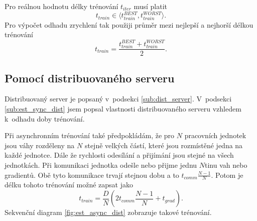 Pro reálnou hodnotu délky trénování $t_{iter}$ musí platit \begin{equation}t_{train} \in \langle t_{train}^{BEST},t_{train}^{WORST} \rangle.\label{eq:est_async_in}\end{equation}
Pro výpočet odhadu zrychlení tak použiji průměr mezi nejlepší a nejhorší délkou trénování \begin{equation}t_{train} = \frac{t_{train}^{BEST}+t_{train}^{WORST}}{2}.\label{eq:est_async_mean}\end{equation}

\subsection{Pomocí distribuovaného serveru}
\label{sub:est_async_dist}

Distribuovaný server je popsaný v~podsekci \ref{sub:dist_server}.
V~podsekci \ref{sub:est_sync_dist} jsem popsal vlastnosti distribuovaného serveru vzhledem k~odhadu doby trénování.

Při asynchronním trénování také předpokládám, že pro $N$ pracovních jednotek jsou váhy rozděleny na $N$ stejně velkých částí, které jsou rozmístěné jedna na každé jednotce.
Dále že rychlosti odesílání a přijímání jsou stejné na všech jednotkách.
Při komunikaci jednotka odešle nebo přijme jednu $N$tinu vah nebo gradientů.
Obě tyto komunikace trvají stejnou dobu a to $t_{comm}\frac{N-1}{N}$.
Potom je délku tohoto trénování možné zapsat jako \begin{equation}t_{train}=\frac{D}{N}(2t_{comm}\frac{N-1}{N}+t_{grad}).\label{eq:est_async_dist}\end{equation}
Sekvenční diagram \ref{fig:est_async_dist} zobrazuje takové trénování.


